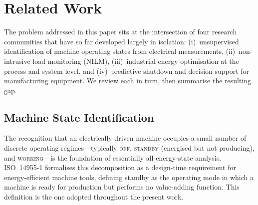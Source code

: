 %
%
%      

\section{Related Work}
\label{sec:related}

The problem addressed in this paper sits at the intersection of four
research communities that have so far developed largely in isolation:
(i)~unsupervised identification of machine operating states from
electrical measurements, (ii)~non-intrusive load monitoring (NILM),
(iii)~industrial energy optimisation at the process and system level,
and (iv)~predictive shutdown and decision support for manufacturing
equipment. We review each in turn, then summarise the resulting gap.


\subsection{Machine State Identification}
\label{sec:rw:states}

The recognition that an electrically driven machine occupies a small
number of discrete operating regimes---typically \textsc{off},
\textsc{standby} (energised but not producing), and \textsc{working}---is
the foundation of essentially all energy-state analysis. ISO~14955-1
\cite{iso14955} formalises this decomposition as a design-time
requirement for energy-efficient machine tools, defining standby as the
operating mode in which a machine is ready for production but performs
no value-adding function. This definition is the one adopted throughout
the present work.

